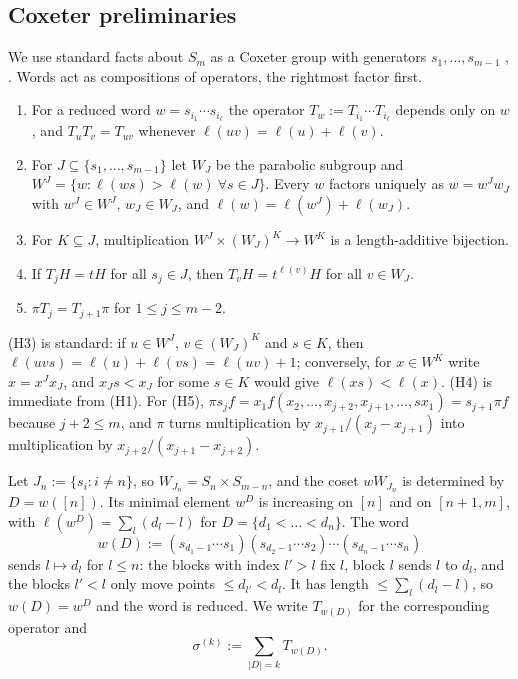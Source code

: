\documentclass[11pt]{amsart}
\theoremstyle{definition}
\theoremstyle{remark}
\numberwithin{equation}{section}
\begin{document}
\subsection{Coxeter preliminaries}
We use standard facts about $S_m$ as a Coxeter group with generators $s_1,\dots,s_{m-1}$ \cite[\S\S1.10, 5.12]{Humphreys90}, \cite[\S2.4]{BjornerBrenti05}. Words act as compositions of operators, the rightmost factor first.
\begin{enumerate}
\item[(H1)] For a reduced word $w=s_{i_1}\cdots s_{i_\ell}$ the operator $T_w:=T_{i_1}\cdots T_{i_\ell}$ depends only on $w$, and $T_uT_v=T_{uv}$ whenever $\ell(uv)=\ell(u)+\ell(v)$.
\item[(H2)] For $J\subseteq\{s_1,\dots,s_{m-1}\}$ let $W_J$ be the parabolic subgroup and $W^J=\{w:\ell(ws)>\ell(w)\ \forall s\in J\}$. Every $w$ factors uniquely as $w=w^Jw_J$ with $w^J\in W^J$, $w_J\in W_J$, and $\ell(w)=\ell(w^J)+\ell(w_J)$.
\item[(H3)] For $K\subseteq J$, multiplication $W^J\times(W_J)^K\to W^K$ is a length-additive bijection.
\item[(H4)] If $T_jH=tH$ for all $s_j\in J$, then $T_vH=t^{\ell(v)}H$ for all $v\in W_J$.
\item[(H5)] $\pi T_j=T_{j+1}\pi$ for $1\le j\le m-2$.
\end{enumerate}
(H3) is standard: if $u\in W^J$, $v\in(W_J)^K$ and $s\in K$, then $\ell(uvs)=\ell(u)+\ell(vs)=\ell(uv)+1$; conversely, for $x\in W^K$ write $x=x^Jx_J$, and $x_Js<x_J$ for some $s\in K$ would give $\ell(xs)<\ell(x)$. (H4) is immediate from (H1). For (H5), $\pi s_jf=x_1f(x_2,\dots,x_{j+2},x_{j+1},\dots,sx_1)=s_{j+1}\pi f$ because $j+2\le m$, and $\pi$ turns multiplication by $x_{j+1}/(x_j-x_{j+1})$ into multiplication by $x_{j+2}/(x_{j+1}-x_{j+2})$.

Let $J_n:=\{s_i:i\neq n\}$, so $W_{J_n}=S_n\times S_{m-n}$, and the coset $wW_{J_n}$ is determined by $D=w([n])$. Its minimal element $w^D$ is increasing on $[n]$ and on $[n+1,m]$, with $\ell(w^D)=\sum_l(d_l-l)$ for $D=\{d_1<\dots<d_n\}$. The word
\[ w(D):=(s_{d_1-1}\cdots s_1)(s_{d_2-1}\cdots s_2)\cdots(s_{d_n-1}\cdots s_n) \]
sends $l\mapsto d_l$ for $l\le n$: the blocks with index $l'>l$ fix $l$, block $l$ sends $l$ to $d_l$, and the blocks $l'<l$ only move points $\le d_{l'}<d_l$. It has length $\le\sum_l(d_l-l)$, so $w(D)=w^D$ and the word is reduced. We write $T_{w(D)}$ for the corresponding operator and
\[ \sigma^{(k)}:=\sum_{|D|=k}T_{w(D)} . \]
\end{document}
